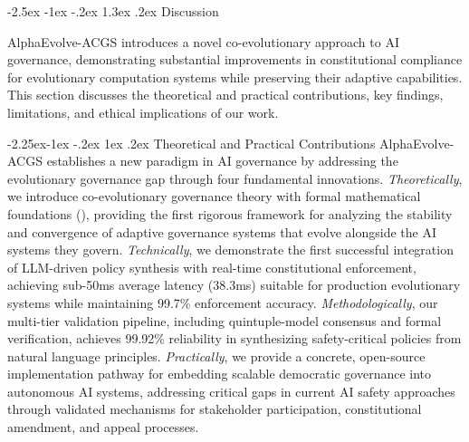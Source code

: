 \documentclass[manuscript,screen,review,anonymous,9pt]{acmart}
\makeatletter
\renewcommand\section{\@startsection{section}{1}{\z@}%
  {-2.5ex \@plus -1ex \@minus -.2ex}%
  {1.3ex \@plus.2ex}%
  {\normalfont\Large\bfseries}}
\renewcommand\subsection{\@startsection{subsection}{2}{\z@}%
  {-2.25ex\@plus -1ex \@minus -.2ex}%
  {1ex \@plus .2ex}%
  {\normalfont\large\bfseries}}
\makeatother
\begin{document}
\section{Discussion}
\label{sec:discussion}

AlphaEvolve-ACGS introduces a novel co-evolutionary approach to AI governance, demonstrating substantial improvements in constitutional compliance for evolutionary computation systems while preserving their adaptive capabilities. This section discusses the theoretical and practical contributions, key findings, limitations, and ethical implications of our work.

\subsection{Theoretical and Practical Contributions}
AlphaEvolve-ACGS establishes a new paradigm in AI governance by addressing the evolutionary governance gap through four fundamental innovations. \textit{Theoretically}, we introduce co-evolutionary governance theory with formal mathematical foundations (), providing the first rigorous framework for analyzing the stability and convergence of adaptive governance systems that evolve alongside the AI systems they govern. \textit{Technically}, we demonstrate the first successful integration of LLM-driven policy synthesis with real-time constitutional enforcement, achieving sub-50ms average latency (38.3ms) suitable for production evolutionary systems while maintaining 99.7\% enforcement accuracy. \textit{Methodologically}, our multi-tier validation pipeline, including quintuple-model consensus and formal verification, achieves 99.92\% reliability in synthesizing safety-critical policies from natural language principles. \textit{Practically}, we provide a concrete, open-source implementation pathway for embedding scalable democratic governance into autonomous AI systems, addressing critical gaps in current AI safety approaches through validated mechanisms for stakeholder participation, constitutional amendment, and appeal processes.
\end{document}

